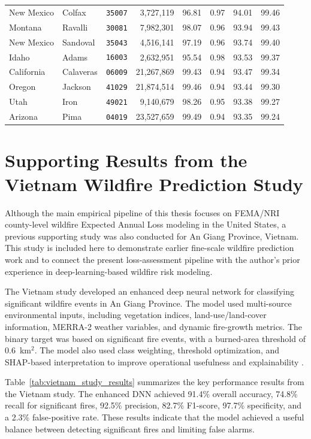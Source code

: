 \begin{table}[htbp]
{\begin{tabular}{lllrrrrr}
New Mexico & Colfax & \texttt{35007} & 3,727,119 & 96.81 & 0.97 & 94.01 & 99.46 \\
Montana & Ravalli & \texttt{30081} & 7,982,301 & 98.07 & 0.96 & 93.94 & 99.43 \\
New Mexico & Sandoval & \texttt{35043} & 4,516,141 & 97.19 & 0.96 & 93.74 & 99.40 \\
Idaho & Adams & \texttt{16003} & 2,632,951 & 95.54 & 0.98 & 93.53 & 99.37 \\
California & Calaveras & \texttt{06009} & 21,267,869 & 99.43 & 0.94 & 93.47 & 99.34 \\
Oregon & Jackson & \texttt{41029} & 21,874,514 & 99.46 & 0.94 & 93.44 & 99.30 \\
Utah & Iron & \texttt{49021} & 9,140,679 & 98.26 & 0.95 & 93.38 & 99.27 \\
Arizona & Pima & \texttt{04019} & 23,527,659 & 99.49 & 0.94 & 93.35 & 99.24 \\
\bottomrule
\end{tabular}%
}
\end{table}

\section{Supporting Results from the Vietnam Wildfire Prediction Study}
\label{sec:vietnam_results}

Although the main empirical pipeline of this thesis focuses on FEMA/NRI county-level wildfire Expected Annual Loss modeling in the United States, a previous supporting study was also conducted for An Giang Province, Vietnam. This study is included here to demonstrate earlier fine-scale wildfire prediction work and to connect the present loss-assessment pipeline with the author's prior experience in deep-learning-based wildfire risk modeling.

The Vietnam study developed an enhanced deep neural network for classifying significant wildfire events in An Giang Province. The model used multi-source environmental inputs, including vegetation indices, land-use/land-cover information, MERRA-2 weather variables, and dynamic fire-growth metrics. The binary target was based on significant fire events, with a burned-area threshold of 0.6~km$^2$. The model also used class weighting, threshold optimization, and SHAP-based interpretation to improve operational usefulness and explainability \citep{suliman2026angiang}.

Table~\ref{tab:vietnam_study_results} summarizes the key performance results from the Vietnam study. The enhanced DNN achieved 91.4\% overall accuracy, 74.8\% recall for significant fires, 92.5\% precision, 82.7\% F1-score, 97.7\% specificity, and a 2.3\% false-positive rate. These results indicate that the model achieved a useful balance between detecting significant fires and limiting false alarms.

